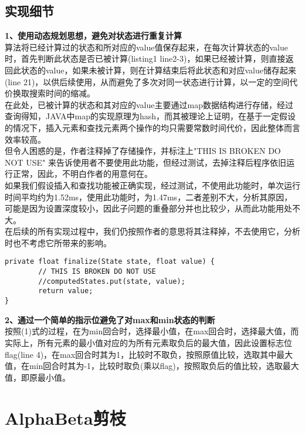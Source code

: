 \documentclass[UTF8]{article}
\begin{document}
\subsection{实现细节}
\indent\textbf{1、使用动态规划思想，避免对状态进行重复计算}\\
\indent 算法将已经计算过的状态和所对应的value值保存起来，在每次计算状态的value时，首先判断此状态是否已被计算(listing1 line2-3)，如果已经被计算，则直接返回此状态的value，如果未被计算，则在计算结束后将此状态和对应value储存起来(line 21)，以供后续使用，从而避免了多次对同一状态进行计算，以一定的空间代价换取搜索时间的缩减。\\
\indent 在此处，已被计算的状态和其对应的value主要通过map数据结构进行存储，经过查询得知，JAVA中map的实现原理为hash，而其被理论上证明，在基于一定假设的情况下，插入元素和查找元素两个操作的均只需要常数时间代价，因此整体而言效率较高。\\
\indent 但令人困惑的是，作者注释掉了存储操作，并标注上"THIS IS BROKEN DO NOT USE" 来告诉使用者不要使用此功能，但经过测试，去掉注释后程序依旧运行正常，因此，不明白作者的用意何在。\\
\indent 如果我们假设插入和查找功能被正确实现，经过测试，不使用此功能时，单次运行时间平均约为1.52ms，使用此功能时，为1.47ms，二者差别不大，分析其原因，可能是因为设置深度较小，因此子问题的重叠部分并也比较少，从而此功能用处不大。\\
\indent 在后续的所有实现过程中，我们仍按照作者的意思将其注释掉，不去使用它，分析时也不考虑它所带来的影响。\\
\begin{lstlisting}[caption=存储state-value pair]
private float finalize(State state, float value) {
		// THIS IS BROKEN DO NOT USE
		//computedStates.put(state, value);
		return value;
}
\end{lstlisting}

\indent\textbf{2、通过一个简单的指示位避免了对max和min状态的判断}\\
\indent 按照(1)式的过程，在为min回合时，选择最小值，在max回合时，选择最大值，而实际上，所有元素的最小值对应的为所有元素取负后的最大值，因此设置标志位flag(line 4)，在max回合时其为1，比较时不取负，按照原值比较，选取其中最大值，在min回合时其为-1，比较时取负(乘以flag)，按照取负后的值比较，选取最大值，即原最小值。

\section{AlphaBeta剪枝}
\end{document}
